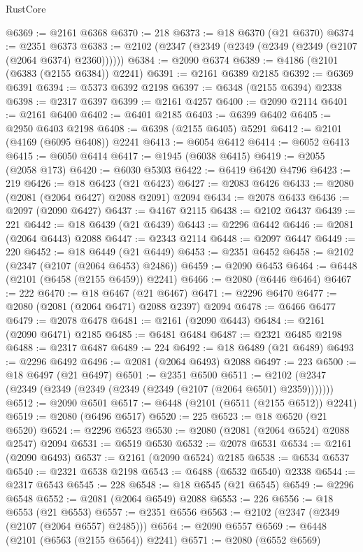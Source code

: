 \begin{lexlean}{RustCore}
\begin{coremodule}
@6369 := @2161 @6368
@6370 := 218
@6373 := @18 @6370 (@21 @6370)
@6374 := @2351 @6373
@6383 := @2102 (@2347 (@2349 (@2349 (@2349 (@2349 (@2107 (@2064 @6374) @2360))))))
@6384 := @2090 @6374
@6389 := @4186 (@2101 (@6383 (@2155 @6384)) @2241)
@6391 := @2161 @6389 @2185
@6392 := @6369 @6391
@6394 := @5373 @6392 @2198
@6397 := @6348 (@2155 @6394) @2338
@6398 := @2317 @6397
@6399 := @2161 @4257
@6400 := @2090 @2114
@6401 := @2161 @6400
@6402 := @6401 @2185
@6403 := @6399 @6402
@6405 := @2950 @6403 @2198
@6408 := @6398 (@2155 @6405) @5291
@6412 := @2101 (@4169 (@6095 @6408)) @2241
@6413 := @6054 @6412
@6414 := @6052 @6413
@6415 := @6050 @6414
@6417 := @1945 (@6038 @6415)
@6419 := @2055 (@2058 @173)
@6420 := @6030 @5303
@6422 := @6419 @6420 @4796
@6423 := 219
@6426 := @18 @6423 (@21 @6423)
@6427 := @2083 @6426
@6433 := @2080 (@2081 (@2064 @6427) @2088 @2091) @2094
@6434 := @2078 @6433
@6436 := @2097 (@2090 @6427)
@6437 := @4167 @2115
@6438 := @2102 @6437
@6439 := 221
@6442 := @18 @6439 (@21 @6439)
@6443 := @2296 @6442
@6446 := @2081 (@2064 @6443) @2088
@6447 := @2343 @2114
@6448 := @2097 @6447
@6449 := 220
@6452 := @18 @6449 (@21 @6449)
@6453 := @2351 @6452
@6458 := @2102 (@2347 (@2107 (@2064 @6453) @2486))
@6459 := @2090 @6453
@6464 := @6448 (@2101 (@6458 (@2155 @6459)) @2241)
@6466 := @2080 (@6446 @6464)
@6467 := 222
@6470 := @18 @6467 (@21 @6467)
@6471 := @2296 @6470
@6477 := @2080 (@2081 (@2064 @6471) @2088 @2397) @2094
@6478 := @6466 @6477
@6479 := @2078 @6478
@6481 := @2161 (@2090 @6443)
@6484 := @2161 (@2090 @6471) @2185
@6485 := @6481 @6484
@6487 := @2321 @6485 @2198
@6488 := @2317 @6487
@6489 := 224
@6492 := @18 @6489 (@21 @6489)
@6493 := @2296 @6492
@6496 := @2081 (@2064 @6493) @2088
@6497 := 223
@6500 := @18 @6497 (@21 @6497)
@6501 := @2351 @6500
@6511 := @2102 (@2347 (@2349 (@2349 (@2349 (@2349 (@2349 (@2107 (@2064 @6501) @2359)))))))
@6512 := @2090 @6501
@6517 := @6448 (@2101 (@6511 (@2155 @6512)) @2241)
@6519 := @2080 (@6496 @6517)
@6520 := 225
@6523 := @18 @6520 (@21 @6520)
@6524 := @2296 @6523
@6530 := @2080 (@2081 (@2064 @6524) @2088 @2547) @2094
@6531 := @6519 @6530
@6532 := @2078 @6531
@6534 := @2161 (@2090 @6493)
@6537 := @2161 (@2090 @6524) @2185
@6538 := @6534 @6537
@6540 := @2321 @6538 @2198
@6543 := @6488 (@6532 @6540) @2338
@6544 := @2317 @6543
@6545 := 228
@6548 := @18 @6545 (@21 @6545)
@6549 := @2296 @6548
@6552 := @2081 (@2064 @6549) @2088
@6553 := 226
@6556 := @18 @6553 (@21 @6553)
@6557 := @2351 @6556
@6563 := @2102 (@2347 (@2349 (@2107 (@2064 @6557) @2485)))
@6564 := @2090 @6557
@6569 := @6448 (@2101 (@6563 (@2155 @6564)) @2241)
@6571 := @2080 (@6552 @6569)

\end{coremodule}
\end{lexlean}
